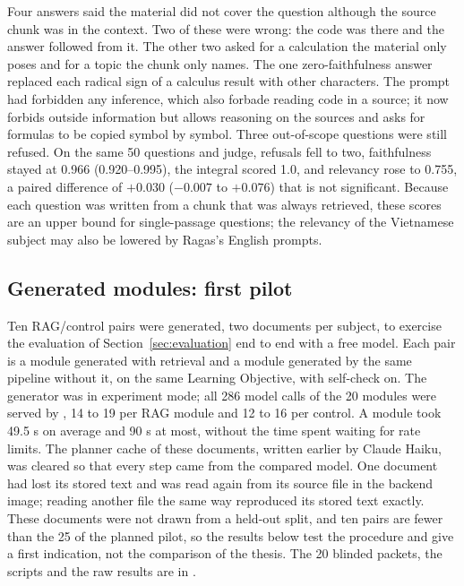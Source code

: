 Four answers said the material did not cover the question although the source chunk was in the context. Two of these were wrong: the code was there and the answer followed from it. The other two asked for a calculation the material only poses and for a topic the chunk only names. The one zero-faithfulness answer replaced each radical sign of a calculus result with other characters. The prompt had forbidden any inference, which also forbade reading code in a source; it now forbids outside information but allows reasoning on the sources and asks for formulas to be copied symbol by symbol. Three out-of-scope questions were still refused. On the same 50 questions and judge, refusals fell to two, faithfulness stayed at 0.966 (0.920--0.995), the integral scored 1.0, and relevancy rose to 0.755, a paired difference of $+0.030$ ($-0.007$ to $+0.076$) that is not significant. Because each question was written from a chunk that was always retrieved, these scores are an upper bound for single-passage questions; the relevancy of the Vietnamese subject may also be lowered by Ragas's English prompts.

\subsection{Generated modules: first pilot}\label{sec:results-modules}
Ten RAG/control pairs were generated, two documents per subject, to exercise the evaluation of Section~\ref{sec:evaluation} end to end with a free model. Each pair is a module generated with retrieval and a module generated by the same pipeline without it, on the same Learning Objective, with self-check on. The generator was  in experiment mode; all 286 model calls of the 20 modules were served by , 14 to 19 per RAG module and 12 to 16 per control. A module took 49.5 s on average and 90 s at most, without the time spent waiting for rate limits. The planner cache of these documents, written earlier by Claude Haiku, was cleared so that every step came from the compared model. One document had lost its stored text and was read again from its source file in the backend image; reading another file the same way reproduced its stored text exactly. These documents were not drawn from a held-out split, and ten pairs are fewer than the 25 of the planned pilot, so the results below test the procedure and give a first indication, not the comparison of the thesis. The 20 blinded packets, the scripts and the raw results are in .

